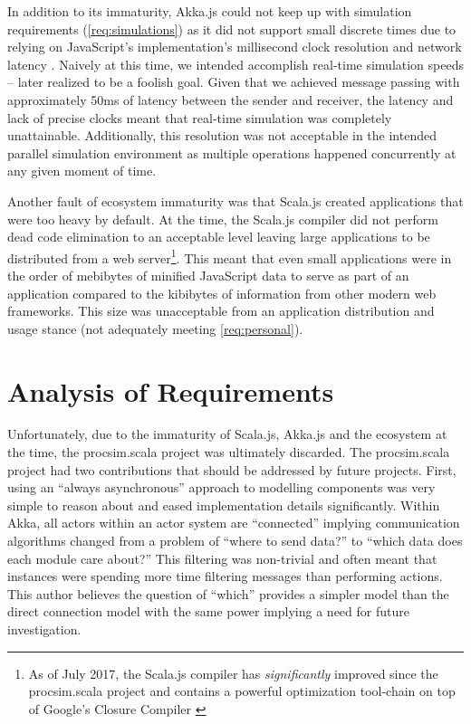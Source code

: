 In addition to its immaturity, Akka.js could not keep up with simulation requirements (\cref{req:simulations}) as it did not support small discrete times due to relying on JavaScript's  implementation's millisecond clock resolution and network latency \cite{MDN:Date}. Naively at this time, we intended accomplish real-time simulation speeds -- later realized to be a foolish goal. Given that we achieved message passing with approximately 50ms of latency between the sender and receiver, the latency and lack of precise clocks meant that real-time simulation was completely unattainable. Additionally, this resolution was not acceptable in the intended parallel simulation environment as multiple operations happened concurrently at any given moment of time. 

Another fault of ecosystem immaturity was that Scala.js created applications that were too heavy by default. At the time, the Scala.js compiler did not perform dead code elimination to an acceptable level leaving large applications to be distributed from a web server\footnote{As of July 2017, the Scala.js compiler has \textit{significantly} improved since the procsim.scala project and contains a powerful optimization tool-chain on top of Google's Closure Compiler \cite{Scala-js:CompOptPipeline}}. This meant that even small applications were in the order of mebibytes of minified JavaScript data to serve as part of an application compared to the kibibytes of information from other modern web frameworks. This size was unacceptable from an application distribution and usage stance (not adequately meeting \cref{req:personal}). 

\section{Analysis of Requirements}

Unfortunately, due to the immaturity of Scala.js, Akka.js and the ecosystem at the time, the procsim.scala project was ultimately discarded. The procsim.scala project had two contributions that should be addressed by future projects. First, using an ``always asynchronous'' approach to modelling components was very simple to reason about and eased implementation details significantly. Within Akka, all actors within an actor system are ``connected'' implying communication algorithms changed from a problem of ``where to send data?'' to ``which data does each module care about?'' This filtering was non-trivial and often meant that \akkaActor{} instances were spending more time filtering messages than performing actions. This author believes the question of ``which'' provides a simpler model than the direct connection model with the same power implying a need for future investigation. 

